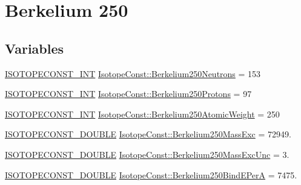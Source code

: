 \hypertarget{group___isotope_const-_berkelium-_bk250}{}\section{Berkelium 250}
\label{group___isotope_const-_berkelium-_bk250}
\subsection*{Variables}
\begin{DoxyCompactItemize}
\item 
\mbox{\hyperlink{group___isotope_const-_macros_ga5f18360b3e99483a35c32d789e62621c}{I\+S\+O\+T\+O\+P\+E\+C\+O\+N\+S\+T\+\_\+\+I\+NT}} \mbox{\hyperlink{group___isotope_const-_berkelium-_bk250_ga5cbefa2fce864d2221fc0bfcf8ea5d34}{Isotope\+Const\+::\+Berkelium250\+Neutrons}} = 153
\item 
\mbox{\hyperlink{group___isotope_const-_macros_ga5f18360b3e99483a35c32d789e62621c}{I\+S\+O\+T\+O\+P\+E\+C\+O\+N\+S\+T\+\_\+\+I\+NT}} \mbox{\hyperlink{group___isotope_const-_berkelium-_bk250_ga07a1f136d024edbde64c34f3f2736430}{Isotope\+Const\+::\+Berkelium250\+Protons}} = 97
\item 
\mbox{\hyperlink{group___isotope_const-_macros_ga5f18360b3e99483a35c32d789e62621c}{I\+S\+O\+T\+O\+P\+E\+C\+O\+N\+S\+T\+\_\+\+I\+NT}} \mbox{\hyperlink{group___isotope_const-_berkelium-_bk250_ga2f0e35814183f488c199509bfce5c5ae}{Isotope\+Const\+::\+Berkelium250\+Atomic\+Weight}} = 250
\item 
\mbox{\hyperlink{group___isotope_const-_macros_ga8f45a7272ce02c0b4c65c44636ed719a}{I\+S\+O\+T\+O\+P\+E\+C\+O\+N\+S\+T\+\_\+\+D\+O\+U\+B\+LE}} \mbox{\hyperlink{group___isotope_const-_berkelium-_bk250_gae5fca81a0f0fdf09023a9040eaf535ed}{Isotope\+Const\+::\+Berkelium250\+Mass\+Exc}} = 72949.
\item 
\mbox{\hyperlink{group___isotope_const-_macros_ga8f45a7272ce02c0b4c65c44636ed719a}{I\+S\+O\+T\+O\+P\+E\+C\+O\+N\+S\+T\+\_\+\+D\+O\+U\+B\+LE}} \mbox{\hyperlink{group___isotope_const-_berkelium-_bk250_gaf7ed3ea64d2eae63cc989b7223fb63f8}{Isotope\+Const\+::\+Berkelium250\+Mass\+Exc\+Unc}} = 3.
\item 
\mbox{\hyperlink{group___isotope_const-_macros_ga8f45a7272ce02c0b4c65c44636ed719a}{I\+S\+O\+T\+O\+P\+E\+C\+O\+N\+S\+T\+\_\+\+D\+O\+U\+B\+LE}} \mbox{\hyperlink{group___isotope_const-_berkelium-_bk250_ga0e51126d470fbeae857e069126c2f9e0}{Isotope\+Const\+::\+Berkelium250\+Bind\+E\+PerA}} = 7475.
\item 

\end{DoxyCompactItemize}
